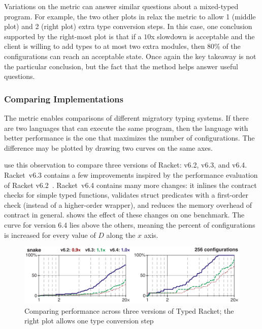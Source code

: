 Variations on the  metric can answer similar questions
 about a mixed-typed program.
For example, the two other plots in 
 relax the metric to allow 1 (middle plot) and 2 (right plot) extra type
 conversion steps.
In this case, one conclusion supported by the right-most plot is that
 if a $10$x slowdown is acceptable and the client is willing to add types
 to at most two extra modules, then 80\% of the configurations can reach
 an acceptable state.
Once again the key takeaway is not the particular conclusion,
 but the fact that the method helps answer useful questions.


\subsubsection{Comparing Implementations}


The  metric enables comparisons of different migratory
 typing systems.
If there are two languages that can execute the same program,
 then the language with better performance is the one that maximizes the
 number of  configurations.
The difference may be plotted by drawing two curves on the same
 axes.

\citet{gtnffvf-jfp-2019} use this observation to compare three versions
 of Racket: v6.2, v6.3, and v6.4.
Racket~v6.3 contains a few improvements inspired by the performance
 evaluation of Racket v6.2~\cite{tfgnvf-popl-2016}.
Racket~v6.4 contains many more changes:
 it inlines the contract checks for simple typed functions,
 validates struct predicates with a first-order check (instead of a higher-order wrapper),
 and reduces the memory overhead of contract in general.
 shows the effect of these changes on one benchmark.
The curve for version 6.4 lies above the others, meaning the percent of
  configurations is increased for every value of $D$ along
 the $x$ axis.

\begin{figure}[h]
\includegraphics[width=0.8\columnwidth]{src/snake-jfp.png}
\caption{Comparing performance across three versions of Typed Racket; the right plot allows one type conversion step}
\label{fig:snake-jfp}
\end{figure}

